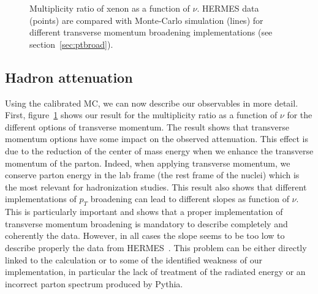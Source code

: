 \begin{figure}[tbp]
  \centering
{}
\caption {Multiplicity ratio of xenon as a function of $\nu$. HERMES data~%
\cite{Airapetian:2011jp} (points) are compared with Monte-Carlo simulation 
(lines) for different transverse momentum broadening implementations (see 
section~\ref{sec:ptbroad}).}
\label{fig:PtC-Rnu}
\end{figure}


\subsection{Hadron attenuation}

Using the calibrated MC, we can now describe our observables in more detail. First, figure~\ref{fig:PtC-Rnu} shows our result for the multiplicity ratio as a function of $\nu$ for the different options of transverse momentum. The result shows that transverse momentum options have some impact on the observed attenuation. This effect is due to the reduction of the center of mass energy when we enhance the transverse momentum of the parton. Indeed, when applying transverse momentum, we conserve parton energy in the lab frame (the rest frame of the nuclei) which is the most relevant for hadronization studies. This result also shows that different implementations of $p_T$ broadening can lead to different slopes as function of $\nu$. This is particularly important and shows that a proper implementation of transverse momentum broadening is mandatory to describe completely and coherently the data. However, in all cases the slope seems to be too low to describe properly the data from HERMES~\cite{Airapetian:2011jp}. This problem can be either directly linked to the calculation or to some of the identified weakness of our implementation, in particular the lack of treatment of the radiated energy or an incorrect parton spectrum produced by Pythia.

